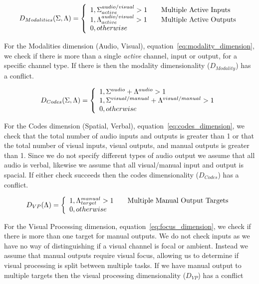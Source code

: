 \begin{equation}
D_{Modalities}(\Sigma, \Lambda) = \left\{ 
  \begin{array}{l l}
    1, \Sigma_{active}^{audio/visual} > 1 & \quad \text{Multiple Active Inputs}\\
    1, \Lambda_{active}^{audio/visual} > 1 & \quad \text{Multiple Active Outputs}\\
    0, otherwise
  \end{array}
  \right.
  \label{eq:modality_dimension}
\end{equation}

For the Modalities dimension (Audio, Visual), equation~\ref{eq:modality_dimension}, we check if there is more than a single {\em active} channel, input or output, for a specific channel type.  If there is then the modality dimensionality ($D_{Modality}$) has a conflict.

\begin{equation}
D_{Codes}(\Sigma, \Lambda) = \left\{ 
  \begin{array}{l l}
    1, \Sigma^{audio} + \Lambda^{audio} > 1\\
    1, \Sigma^{visual/manual} + \Lambda^{visual/manual} > 1\\
    0, otherwise
  \end{array}
  \right.
  \label{eq:codes_dimension}
\end{equation}

For the Codes dimension (Spatial, Verbal), equation~\ref{eq:codes_dimension}, we check that the total number of audio inputs and outputs is greater than 1 or that the total number of visual inputs, visual outputs, and manual outputs is greater than 1.  Since we do not specify different types of audio output we assume that all audio is verbal, likewise we assume that all visual/manual input and output is spacial.  If either check succeeds then the codes dimensionality ($D_{Codes}$) has a conflict.

\begin{equation}
D_{VP}(\Lambda) = \left\{ 
  \begin{array}{l l}
    1, \Lambda_{target}^{manual} > 1 & \quad \text{Multiple Manual Output Targets}\\
    0, otherwise
  \end{array}
  \right.
  \label{eq:focus_dimension}
\end{equation}

For the Visual Processing dimension, equation~\ref{eq:focus_dimension}, we check if there is more than one target for manual outputs.  We do not check inputs as we have no way of distinguishing if a visual channel is focal or ambient.  Instead we assume that manual outputs require visual focus, allowing us to determine if visual processing is split between multiple tasks.  If we have manual output to multiple targets then the visual processing dimensionality ($D_{VP}$) has a conflict

